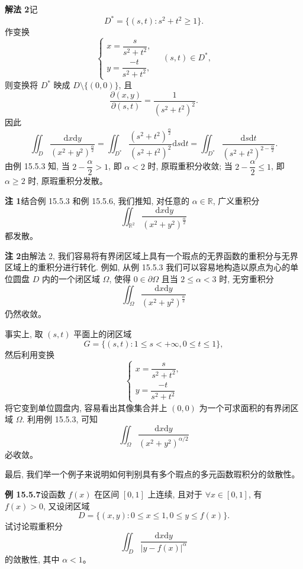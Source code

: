 \documentclass[UTF8, 12pt, fontset=fandol, oneside]{ctexart}
\begin{document}
\noindent\textbf{解法 2}\quad 记
\[
  D^*=\{(s,t):s^2+t^2\geqslant1\}.
\]
作变换
\[
  \begin{cases}
    x=\dfrac{s}{s^2+t^2},\\
    y=\dfrac{-t}{s^2+t^2},
  \end{cases}
  \quad(s,t)\in D^*,
\]
则变换将 $D^*$ 映成 $D\setminus\{(0,0)\}$, 且
\[
  \frac{\partial(x,y)}{\partial(s,t)}=\frac1{(s^2+t^2)^2}.
\]
因此
\[
  \iint_D\frac{\mathrm dx\mathrm dy}{(x^2+y^2)^{\frac\alpha2}}
  =\iint_{D^*}\frac{(s^2+t^2)^{\frac\alpha2}}{(s^2+t^2)^2}\mathrm ds\mathrm dt
  =\iint_{D^*}\frac{\mathrm ds\mathrm dt}{(s^2+t^2)^{2-\frac\alpha2}}.
\]
由例 15.5.3 知, 当 $2-\dfrac\alpha2>1$, 即 $\alpha<2$ 时, 原瑕重积分收敛; 当 $2-\dfrac\alpha2\leqslant1$, 即 $\alpha\geqslant2$ 时, 原瑕重积分发散。

\noindent\textbf{注 1}\quad 结合例 15.5.3 和例 15.5.6, 我们推知, 对任意的 $\alpha\in\mathbb R$, 广义重积分
\[
  \iint_{\mathbb R^2}\frac{\mathrm dx\mathrm dy}{(x^2+y^2)^{\frac\alpha2}}
\]
都发散。

\noindent\textbf{注 2}\quad 由解法 2, 我们容易将有界闭区域上具有一个瑕点的无界函数的重积分与无界区域上的重积分进行转化. 例如, 从例 15.5.3 我们可以容易地构造以原点为心的单位圆盘 $D$ 内的一个闭区域 $\Omega$, 使得 $0\in\partial\Omega$ 且当 $2\leqslant\alpha<3$ 时, 无穷重积分
\[
  \iint_\Omega\frac{\mathrm dx\mathrm dy}{(x^2+y^2)^{\frac\alpha2}}
\]
仍然收敛。

事实上, 取 $(s,t)$ 平面上的闭区域
\[
  G=\{(s,t):1\leqslant s<+\infty,0\leqslant t\leqslant1\},
\]
然后利用变换
\[
  \begin{cases}
    x=\dfrac{s}{s^2+t^2},\\
    y=\dfrac{-t}{s^2+t^2}
  \end{cases}
\]
将它变到单位圆盘内, 容易看出其像集合并上 $(0,0)$ 为一个可求面积的有界闭区域 $\Omega$. 利用例 15.5.3, 可知
\[
  \iint_\Omega\frac{\mathrm dx\mathrm dy}{(x^2+y^2)^{\alpha/2}}
\]
必收敛。

最后, 我们举一个例子来说明如何判别具有多个瑕点的多元函数瑕积分的敛散性。

\noindent\textbf{例 15.5.7}\quad 设函数 $f(x)$ 在区间 $[0,1]$ 上连续, 且对于 $\forall x\in[0,1]$, 有 $f(x)>0$, 又设闭区域
\[
  D=\{(x,y):0\leqslant x\leqslant1,0\leqslant y\leqslant f(x)\}.
\]
试讨论瑕重积分
\[
  \iint_D\frac{\mathrm dx\mathrm dy}{|y-f(x)|^\alpha}
\]
的敛散性, 其中 $\alpha<1$。
\end{document}
